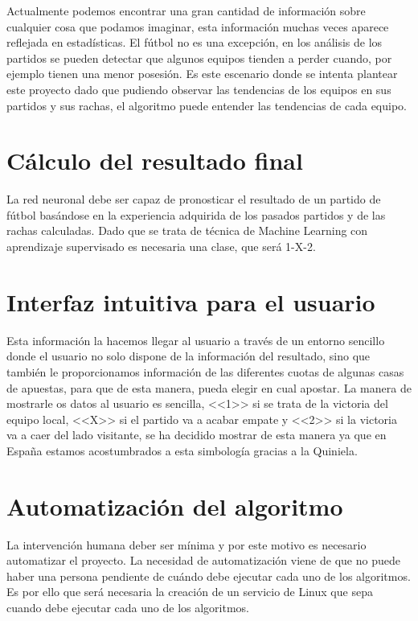
Actualmente podemos encontrar una gran cantidad de información sobre cualquier cosa que podamos imaginar, esta información muchas veces aparece reflejada en estadísticas. El fútbol no es una excepción, en los análisis de los partidos se pueden detectar que algunos equipos tienden a perder cuando, por ejemplo tienen una menor posesión. Es este escenario donde se intenta plantear este proyecto dado que pudiendo observar las tendencias de los equipos en sus partidos y sus rachas, el algoritmo puede entender las tendencias de cada equipo.

\section{Cálculo del resultado final}

La red neuronal debe ser capaz de pronosticar el resultado de un partido de fútbol basándose en la experiencia adquirida de los pasados partidos y de las rachas calculadas. Dado que se trata de técnica de Machine Learning con aprendizaje supervisado es necesaria una clase, que será 1-X-2.

\section{Interfaz intuitiva para el usuario}

Esta información la hacemos llegar al usuario a través de un entorno sencillo donde el usuario no solo dispone de la información del resultado, sino que también le proporcionamos información de las diferentes cuotas de algunas casas de apuestas, para que de esta manera, pueda elegir en cual apostar. La manera de mostrarle os datos al usuario es sencilla, <<1>> si se trata de la victoria del equipo local, <<X>> si el partido va a acabar empate y <<2>> si la victoria va a caer del lado visitante, se ha decidido mostrar de esta manera ya que en España estamos acostumbrados a esta simbología gracias a la Quiniela.

\section{Automatización del algoritmo}
La intervención humana deber ser mínima y por este motivo es necesario automatizar el proyecto. La necesidad de automatización viene de que no puede haber una persona pendiente de cuándo debe ejecutar cada uno de los algoritmos.
Es por ello que será necesaria la creación de un servicio de Linux que sepa cuando debe ejecutar cada uno de los algoritmos.
